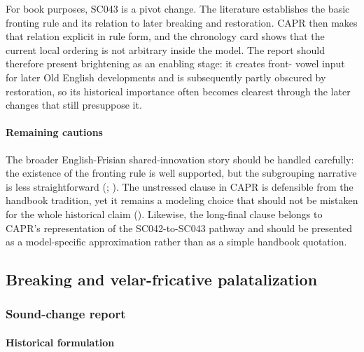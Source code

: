 \documentclass[
  british,
  a4paper,
]{article}
\begin{document}
For book purposes, SC043 is a pivot change. The literature establishes
the basic fronting rule and its relation to later breaking and
restoration. CAPR then makes that relation explicit in rule form, and
the chronology card shows that the current local ordering is not
arbitrary inside the model. The report should therefore present
brightening as an enabling stage: it creates front- vowel input for
later Old English developments and is subsequently partly obscured by
restoration, so its historical importance often becomes clearest through
the later changes that still presuppose it.

\paragraph{Remaining cautions}\label{remaining-cautions-27}

The broader English-Frisian shared-innovation story should be handled
carefully: the existence of the fronting rule is well supported, but the
subgrouping narrative is less straightforward
(;
). The
unstressed clause in CAPR is defensible from the handbook tradition, yet
it remains a modeling choice that should not be mistaken for the whole
historical claim ().
Likewise, the long-final clause belongs to CAPR's representation of the
SC042-to-SC043 pathway and should be presented as a model-specific
approximation rather than as a simple handbook quotation.

\subsection{Breaking and velar-fricative
palatalization}\label{breaking-and-velar-fricative-palatalization}

\subsubsection{Sound-change report}\label{sound-change-report-28}

\paragraph{Historical formulation}\label{historical-formulation-28}
\end{document}

